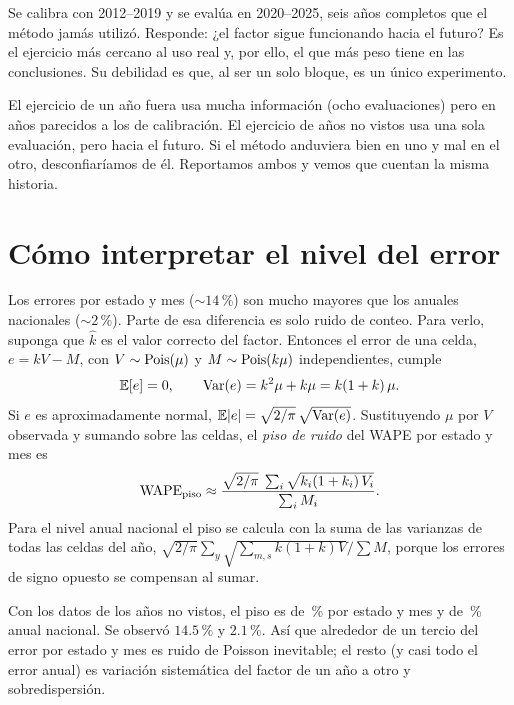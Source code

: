 Se calibra con 2012--2019 y se evalúa en 2020--2025, seis años completos que el método jamás utilizó. Responde: ¿el factor sigue funcionando hacia el futuro? Es el ejercicio más cercano al uso real y, por ello, el que más peso tiene en las conclusiones. Su debilidad es que, al ser un solo bloque, es un único experimento.

\begin{ideaclave}
El ejercicio de un año fuera usa mucha información (ocho evaluaciones) pero en años parecidos a los de calibración. El ejercicio de años no vistos usa una sola evaluación, pero hacia el futuro. Si el método anduviera bien en uno y mal en el otro, desconfiaríamos de él. Reportamos ambos y vemos que cuentan la misma historia.
\end{ideaclave}

\section{Cómo interpretar el nivel del error}\label{sec:piso}

Los errores por estado y mes ($\sim\!14\,\%$) son mucho mayores que los anuales nacionales ($\sim\!2\,\%$). Parte de esa diferencia es solo ruido de conteo. Para verlo, suponga que $\widehat k$ es el valor correcto del factor. Entonces el error de una celda, $e=kV-M$, con $V\sim\operatorname{Pois}(\mu)$ y $M\sim\operatorname{Pois}(k\mu)$ independientes, cumple
\begin{align*}
  \mathbb{E}[e]=0,\qquad \operatorname{Var}(e)=k^2\mu+k\mu=k(1+k)\,\mu.
\end{align*}
Si $e$ es aproximadamente normal, $\mathbb{E}|e|=\sqrt{2/\pi}\,\sqrt{\operatorname{Var}(e)}$. Sustituyendo $\mu$ por $V$ observada y sumando sobre las celdas, el \emph{piso de ruido} del WAPE por estado y mes es
\begin{align*}
  \operatorname{WAPE}_{\text{piso}}\approx\frac{\sqrt{2/\pi}\;\sum_{i}\sqrt{k_i(1+k_i)\,V_i}}{\sum_iM_i}.
\end{align*}
Para el nivel anual nacional el piso se calcula con la suma de las varianzas de todas las celdas del año, $\sqrt{2/\pi}\sum_y\sqrt{\sum_{m,s}k(1+k)V}/\sum M$, porque los errores de signo opuesto se compensan al sumar.

\begin{ejemplo}
Con los datos de los años no vistos, el piso es de \pisoSM{}\,\% por estado y mes y de \pisoAN{}\,\% anual nacional. Se observó $14.5\,\%$ y $2.1\,\%$. Así que alrededor de un tercio del error por estado y mes es ruido de Poisson inevitable; el resto (y casi todo el error anual) es variación sistemática del factor de un año a otro y sobredispersión.
\end{ejemplo}

